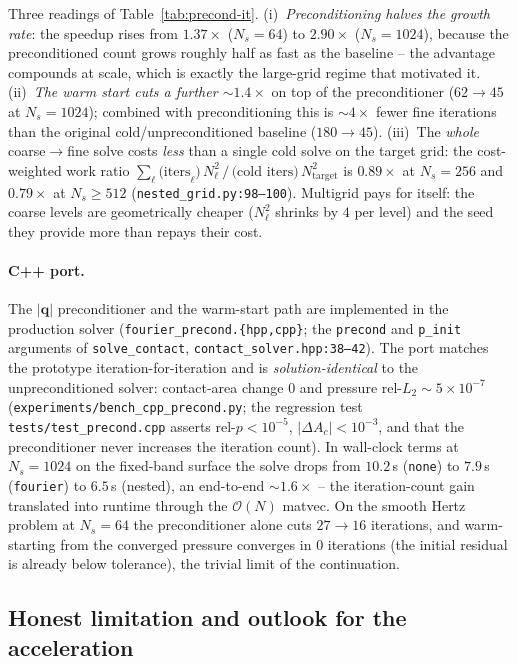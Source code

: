 \documentclass[11pt,a4paper]{article}
\newcommand{\Order}{\mathcal{O}}
\newcommand{\abs}[1]{\left\lvert #1 \right\rvert}
\newcommand{\code}[1]{\texttt{#1}}
\theoremstyle{definition}
\theoremstyle{remark}
\begin{document}
Three readings of Table~\ref{tab:precond-it}.
(i)~\emph{Preconditioning halves the growth rate}: the speedup rises from
$1.37\times$ ($N_s=64$) to $2.90\times$ ($N_s=1024$), because the preconditioned
count grows roughly half as fast as the baseline -- the advantage compounds at
scale, which is exactly the large-grid regime that motivated it.
(ii)~\emph{The warm start cuts a further $\sim1.4\times$} on top of the
preconditioner ($62\!\to\!45$ at $N_s=1024$); combined with preconditioning this
is $\sim4\times$ fewer fine iterations than the original cold/unpreconditioned
baseline ($180\!\to\!45$).
(iii)~The \emph{whole} coarse$\to$fine solve costs \emph{less} than a single cold
solve on the target grid: the cost-weighted work ratio
$\sum_\ell\text{(iters}_\ell)\,N_\ell^2 \,/\, \text{(cold iters)}\,N_{\text{target}}^2$
is $0.89\times$ at $N_s=256$ and $0.79\times$ at $N_s\ge512$
(\code{nested\_grid.py:98--100}). Multigrid pays for itself: the coarse levels are
geometrically cheaper ($N_\ell^2$ shrinks by $4$ per level) and the seed they
provide more than repays their cost.

\paragraph{C++ port.}
The $\abs{\mathbf q}$ preconditioner and the warm-start path are implemented in
the production solver (\code{fourier\_precond.\{hpp,cpp\}}; the \code{precond} and
\code{p\_init} arguments of \code{solve\_contact}, \code{contact\_solver.hpp:38--42}).
The port matches the prototype iteration-for-iteration and is
\emph{solution-identical} to the unpreconditioned solver: contact-area change $0$
and pressure rel-$L_2\sim5\times10^{-7}$ (\code{experiments/bench\_cpp\_precond.py};
the regression test \code{tests/test\_precond.cpp} asserts rel-$p<10^{-5}$,
$\abs{\Delta A_c}<10^{-3}$, and that the preconditioner never increases the
iteration count). In wall-clock terms at $N_s=1024$ on the fixed-band surface the
solve drops from $10.2$\,s (\code{none}) to $7.9$\,s (\code{fourier}) to $6.5$\,s
(nested), an end-to-end $\sim1.6\times$ -- the iteration-count gain translated into
runtime through the $\Order(N)$ matvec. On the smooth Hertz problem at $N_s=64$
the preconditioner alone cuts $27\!\to\!16$ iterations, and warm-starting from the
converged pressure converges in $0$ iterations (the initial residual is already
below tolerance), the trivial limit of the continuation.

\subsection{Honest limitation and outlook for the acceleration}
\label{sec:accel-limit}
\end{document}
